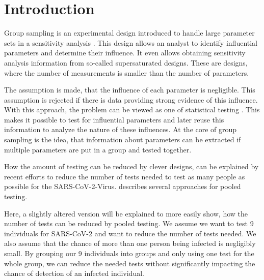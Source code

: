 \documentclass[../../thesis.tex]{subfiles}
\begin{document}
\section{Introduction}
Group sampling is an experimental design introduced to handle large parameter sets in a sensitivity analysis \cite{andres1997sampling}.
This design allows an analyst to identify influential parameters and determine their influence. It even allows
obtaining sensitivity analysis information from so-called supersaturated designs. These are designs, where the number of measurements
is smaller than the number of parameters.



The assumption is made, that the influence of each parameter is negligible. This assumption is rejected if there is data
providing strong evidence of this influence. With this approach, the problem can be viewed as one of statistical testing \cite{saltelli2008global}.
This makes it possible to test for influential parameters and later reuse this information to analyze the nature of these
influences. At the core of group sampling is the idea, that information about parameters can be extracted if multiple
parameters are put in a group and tested together.

How the amount of testing can be reduced by clever designs, can be explained by recent efforts to reduce the number of tests needed
to test as many people as possible for the SARS-CoV-2-Virus.
 describes several approaches for pooled testing.

Here, a slightly altered version will be explained to more easily show, how the number of tests can be reduced by pooled testing.
We assume we want to test 9 individuals for SARS-CoV-2 and want to reduce the number of tests needed. We also assume that the chance of more than
one person being infected is negligibly small. By grouping our 9 individuals into groups and only using one test for the whole group,
we can reduce the needed tests without significantly impacting the chance of detection of an infected individual.
\end{document}
